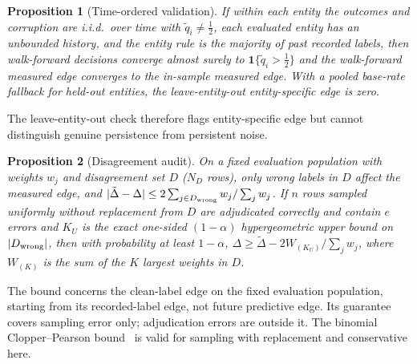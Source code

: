\documentclass[journal]{IEEEtran}
\newtheorem{proposition}{Proposition}
\theoremstyle{definition}
\newcommand{\ind}{\mathbf{1}}
\begin{document}
\begin{proposition}[Time-ordered validation]\label{prop:wf}
If within each entity the outcomes and corruption are i.i.d.\ over time with $\tilde q_i\neq\tfrac12$, each evaluated entity has an unbounded history, and the entity rule is the majority of past recorded labels, then walk-forward decisions converge almost surely to $\ind\{\tilde q_i>\tfrac12\}$ and the walk-forward measured edge converges to the in-sample measured edge. With a pooled base-rate fallback for held-out entities, the leave-entity-out entity-specific edge is zero.
\end{proposition}
The leave-entity-out check therefore flags entity-specific edge but cannot distinguish genuine persistence from persistent noise.

\begin{proposition}[Disagreement audit]\label{prop:audit}
On a fixed evaluation population with weights $w_j$ and disagreement set $D$ ($N_D$ rows), only wrong labels in $D$ affect the measured edge, and $|\tilde\Delta-\Delta|\le2\sum_{j\in D_{\rm wrong}}w_j/\sum_j w_j$. If $n$ rows sampled uniformly without replacement from $D$ are adjudicated correctly and contain $e$ errors and $K_U$ is the exact one-sided $(1-\alpha)$ hypergeometric upper bound on $|D_{\rm wrong}|$, then with probability at least $1-\alpha$, $\Delta\ge\tilde\Delta-2W_{(K_U)}/\sum_jw_j$, where $W_{(K)}$ is the sum of the $K$ largest weights in $D$.
\end{proposition}
The bound concerns the clean-label edge on the fixed evaluation population, starting from its recorded-label edge, not future predictive edge. Its guarantee covers sampling error only; adjudication errors are outside it. The binomial Clopper--Pearson bound~\cite{clopper1934use} is valid for sampling with replacement and conservative here.
\end{document}
